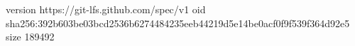 version https://git-lfs.github.com/spec/v1
oid sha256:392b603be03bcd2536b6274484235eeb44219d5e14be0acf0f9f539f364d92e5
size 189492
